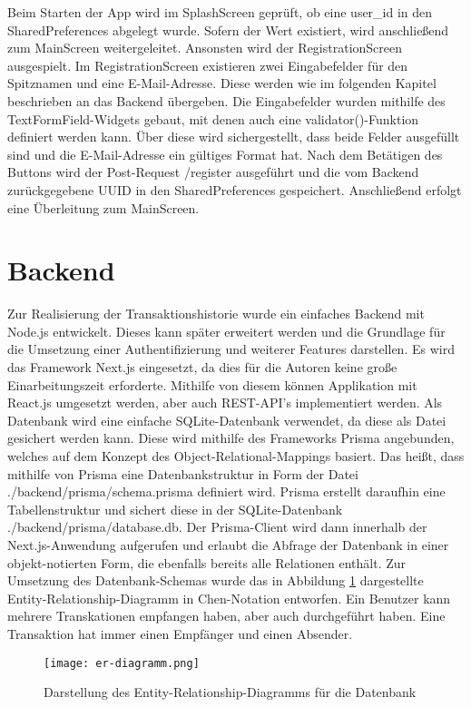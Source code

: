 Beim Starten der App wird im SplashScreen geprüft, ob eine user\_id in den SharedPreferences abgelegt wurde.
Sofern der Wert existiert, wird anschließend zum MainScreen weitergeleitet.
Ansonsten wird der RegistrationScreen ausgespielt. Im RegistrationScreen existieren zwei Eingabefelder für den Spitznamen und eine E-Mail-Adresse.
Diese werden wie im folgenden Kapitel beschrieben an das Backend übergeben.
Die Eingabefelder wurden mithilfe des TextFormField-Widgets gebaut, mit denen auch eine validator()-Funktion definiert werden kann.
Über diese wird sichergestellt, dass beide Felder ausgefüllt sind und die E-Mail-Adresse ein gültiges Format hat.
Nach dem Betätigen des Buttons wird der Post-Request /register ausgeführt und die vom Backend zurückgegebene UUID in den SharedPreferences gespeichert.
Anschließend erfolgt eine Überleitung zum MainScreen.

\section{Backend}

Zur Realisierung der Transaktionshistorie wurde ein einfaches Backend mit Node.js entwickelt.
Dieses kann später erweitert werden und die Grundlage für die Umsetzung einer Authentifizierung und weiterer Features darstellen.
Es wird das Framework Next.js eingesetzt, da dies für die Autoren keine große Einarbeitungszeit erforderte.
Mithilfe von diesem können Applikation mit React.js umgesetzt werden, aber auch REST-API's implementiert werden.
Als Datenbank wird eine einfache SQLite-Datenbank verwendet, da diese als Datei gesichert werden kann.
Diese wird mithilfe des Frameworks Prisma angebunden, welches auf dem Konzept des Object-Relational-Mappings basiert.
Das heißt, dass mithilfe von Prisma eine Datenbankstruktur in Form der Datei ./backend/prisma/schema.prisma definiert wird.
Prisma erstellt daraufhin eine Tabellenstruktur und sichert diese in der SQLite-Datenbank ./backend/prisma/database.db.
Der Prisma-Client wird dann innerhalb der Next.js-Anwendung aufgerufen und erlaubt die Abfrage der Datenbank in einer objekt-notierten Form, die ebenfalls bereits alle Relationen enthält.
Zur Umsetzung des Datenbank-Schemas wurde das in Abbildung \ref{fig:er_diagramm} dargestellte Entity-Relationship-Diagramm in Chen-Notation entworfen.
Ein Benutzer kann mehrere Transkationen empfangen haben, aber auch durchgeführt haben.
Eine Transaktion hat immer einen Empfänger und einen Absender.

\begin{figure}[H]
  \centering
  \texttt{[image: er-diagramm.png]}
  \label{fig:er_diagramm}
  \caption{Darstellung des Entity-Relationship-Diagramms für die Datenbank}
\end{figure}


